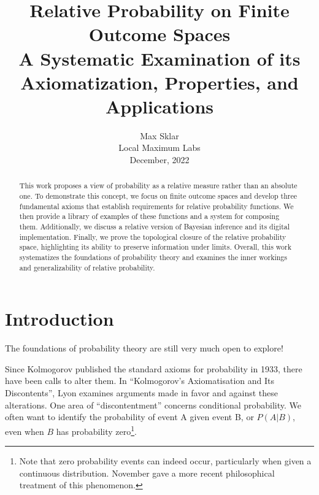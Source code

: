 \documentclass[twoside]{article}
\theoremstyle{plain}%
\theoremstyle{definition}
\theoremstyle{remark}
\begin{document}
\parindent=0in
\parskip=12pt


\title{
  Relative Probability on Finite Outcome Spaces \\
  \large{
    A Systematic Examination of its Axiomatization, Properties, and Applications
  }
}

\author{Max Sklar\\ Local Maximum Labs\\ December, 2022}
\date{}

\maketitle
\thispagestyle{empty}

\begin{abstract}
This work proposes a view of probability as a relative measure rather than an absolute one. To demonstrate this concept, we focus on finite outcome spaces and develop three fundamental axioms that establish requirements for relative probability functions. We then provide a library of examples of these functions and a system for composing them. Additionally, we discuss a relative version of Bayesian inference and its digital implementation. Finally, we prove the topological closure of the relative probability space, highlighting its ability to preserve information under limits. Overall, this work systematizes the foundations of probability theory and examines the inner workings and generalizability of relative probability.
\end{abstract}

\tableofcontents
\newpage

\section{Introduction}

The foundations of probability theory are still very much open to explore!

Since Kolmogorov published the standard axioms for probability\cite{kolmogorov} in 1933, there have been calls to alter them. In ``Kolmogorov's Axiomatisation and Its Discontents'', Lyon\cite{lyon} examines arguments made in favor and against these alterations. One area of ``discontentment'' concerns conditional probability. We often want to identify the probability of event A given event B, or \(P(A|B)\), even when \(B\) has probability zero\footnote{Note that zero probability events can indeed occur, particularly when given a continuous distribution. November\cite{november} gave a more recent philosophical treatment of this phenomenon.}.
\end{document}
